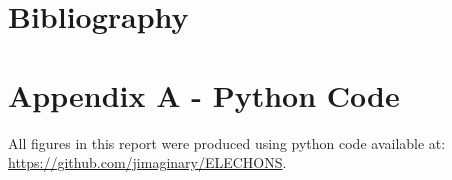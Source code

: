 \documentclass[12pt,a4paper]{article} %
\begin{document}







\newpage
\section*{Bibliography}
{}
\vspace{-1.5cm}



\newpage
\section*{Appendix A - Python Code}
All figures in this report were produced using python code available at: \url{https://github.com/jimaginary/ELECHONS}.
\end{document}
